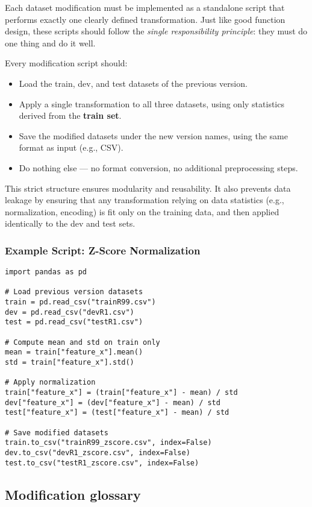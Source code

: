 \documentclass[12pt,openany]{book}
\begin{document}
Each dataset modification must be implemented as a standalone script that performs exactly one clearly defined transformation. Just like good function design, these scripts should follow the \textit{single responsibility principle}: they must do one thing and do it well.

Every modification script should:
\begin{itemize}
    \item Load the train, dev, and test datasets of the previous version.
    \item Apply a single transformation to all three datasets, using only statistics derived from the \textbf{train set}.
    \item Save the modified datasets under the new version names, using the same format as input (e.g., CSV).
    \item Do nothing else — no format conversion, no additional preprocessing steps.
\end{itemize}

This strict structure ensures modularity and reusability. It also prevents data leakage by ensuring that any transformation relying on data statistics (e.g., normalization, encoding) is fit only on the training data, and then applied identically to the dev and test sets.

\subsubsection*{Example Script: Z-Score Normalization}

\begin{verbatim}
import pandas as pd

# Load previous version datasets
train = pd.read_csv("trainR99.csv")
dev = pd.read_csv("devR1.csv")
test = pd.read_csv("testR1.csv")

# Compute mean and std on train only
mean = train["feature_x"].mean()
std = train["feature_x"].std()

# Apply normalization
train["feature_x"] = (train["feature_x"] - mean) / std
dev["feature_x"] = (dev["feature_x"] - mean) / std
test["feature_x"] = (test["feature_x"] - mean) / std

# Save modified datasets
train.to_csv("trainR99_zscore.csv", index=False)
dev.to_csv("devR1_zscore.csv", index=False)
test.to_csv("testR1_zscore.csv", index=False)
\end{verbatim}


\subsection{Modification glossary}
\end{document}
